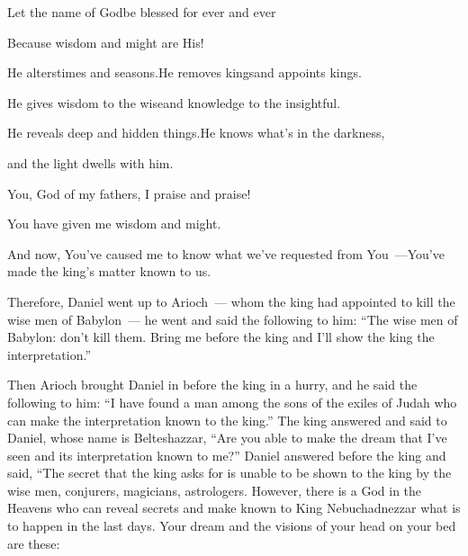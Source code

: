 \begin{inparaenum}
  \pb Let the name of God\pa be blessed for ever and ever%
  
  \pb Because wisdom and might are His!%
  
  \pa {} He alters\pa times and seasons.\pa He removes kings\pa and appoints kings.%
  
  \pb He gives wisdom to the wise\pa and knowledge to the insightful.%
  
  \pa {} He reveals deep%
  and hidden things.\pa He knows what's in the darkness,%
  
  \pb and the light dwells with him.%
  
  \pa {} You, God of my fathers, I praise%
  and praise!%
  
  \pb You have given me wisdom and might.%
  
  \pb And now, You've caused me to know what we've requested from You~---\pa You've made the king's matter known to us.\smallskip%
  
  \noindent{} Therefore, Daniel went up to Arioch~--- whom the king had appointed to kill the wise men of Babylon~--- he went and said the following to him: ``The wise men of Babylon: don't kill them. Bring me before the king and I'll show the king the interpretation.''%
  
   Then Arioch brought Daniel in before the king in a hurry, and he said the following to him: ``I have found a man among the sons of the exiles of Judah who can make the interpretation known to the king.''%
   The king answered and said to Daniel, whose name is Belteshazzar, ``Are you able to make the dream that I've seen and its interpretation known to me?''%
   Daniel answered before the king and said, ``The secret that the king asks for is unable to be shown to the king by the wise men, conjurers, magicians, astrologers.%
   However, there is a God in the Heavens who can reveal secrets and make known to King Nebuchadnezzar what is to happen in the last days. Your dream and the visions of your head on your bed are these:%
  

\end{inparaenum}
